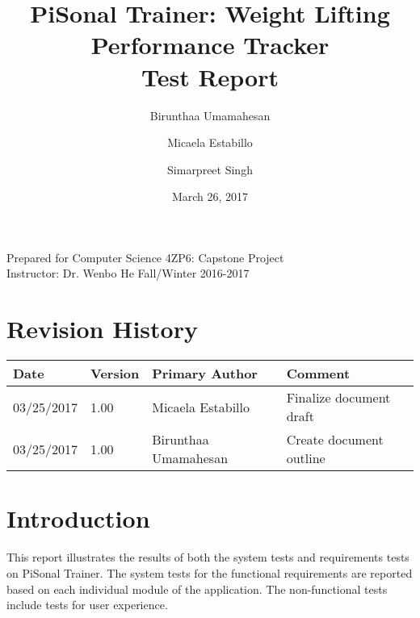 \documentclass{article}
\title{
PiSonal Trainer: Weight Lifting Performance Tracker\\
\Large {Test Report}
}
\date{March 26, 2017}
\author{Birunthaa Umamahesan \and Micaela Estabillo \and Simarpreet Singh}
\begin{document}
\thispagestyle{plain}
\maketitle
\vfill
\begin{center}
    Prepared for Computer Science 4ZP6: Capstone Project \\
    Instructor: Dr. Wenbo He
    Fall/Winter 2016-2017\\
\end{center}
\newpage

\tableofcontents

\listoffigures

\listoftables

\thispagestyle{plain}

\section*{Revision History}
\begingroup
\begin{tabular}{ | p{2cm} | p{1.5cm} | p{3.8cm} | p{7cm} |} 
    \hline
    \textbf{Date} & \textbf{Version} & \textbf{Primary Author} & \textbf{Comment}\\
    \hline
    03/25/2017 & 1.00 & Micaela Estabillo & Finalize document draft\\
    \hline
    03/25/2017 & 1.00 & Birunthaa Umamahesan & Create document outline\\
    \hline
\end{tabular}
\endgroup


\begin{center}
\end{center}

\newpage

\clearpage
\setcounter{page}{1}

% 

\section{Introduction}
This report illustrates the results of both the system tests and requirements tests on PiSonal Trainer. The system tests for the functional requirements are reported based on each individual module of the application. The non-functional tests include tests for user experience.
\end{document}
